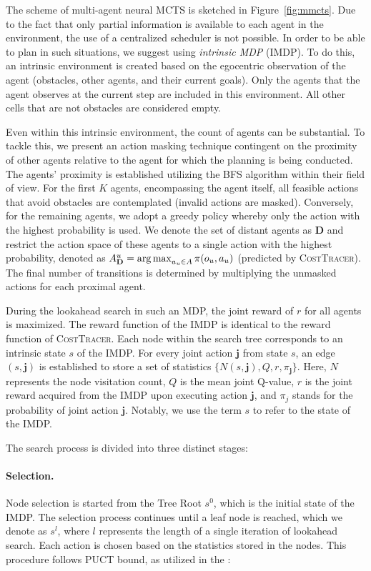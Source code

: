 \documentclass[letterpaper]{article} %
\newcommand{\argmax}{\operatornamewithlimits{arg\,max}}  %
\begin{document}
The scheme of multi-agent neural MCTS is sketched in Figure~\ref{fig:mmcts}.
Due to the fact that only partial information is available to each agent in the environment, the use of a centralized scheduler is not possible. In order to be able to plan in such situations, we suggest using \textit{intrinsic MDP} (IMDP). To do this, an intrinsic environment is created based on the egocentric observation of the agent (obstacles, other agents, and their current goals). Only the agents that the agent observes at the current step are included in this environment. All other cells that are not obstacles are considered empty. 


Even within this intrinsic environment, the count of agents can be substantial. To tackle this, we present an action masking technique contingent on the proximity of other agents relative to the agent for which the planning is being conducted. The agents' proximity is established utilizing the BFS algorithm within their field of view. For the first $K$ agents, encompassing the agent itself, all feasible actions that avoid obstacles are contemplated (invalid actions are masked). Conversely, for the remaining agents, we adopt a greedy policy whereby only the action with the highest probability is used.
We denote the set of distant agents as $\mathbf{D}$ and restrict the action space of these agents to a single action with the highest probability, denoted as $A_\mathbf{D}^u = \argmax_{a_u \in A} \pi(o_u, a_u)$ (predicted by \textsc{CostTracer}). The final number of transitions is determined by multiplying the unmasked actions for each proximal agent.


During the lookahead search in such an MDP, the joint reward of $r$ for all agents is maximized. The reward function of the IMDP is identical to the reward function of  \textsc{CostTracer}.
Each node within the search tree corresponds to an intrinsic state $s$ of the IMDP. For every joint action $\mathbf{j}$ from state $s$, an edge $(s, \mathbf{j})$ is established to store a set of statistics $\{N(s,\mathbf{j}), Q, r, \pi_\mathbf{j}\}$. Here, $N$ represents the node visitation count, $Q$ is the mean joint Q-value, $r$ is the joint reward acquired from the IMDP upon executing action $\mathbf{j}$, and $\pi_j$ stands for the probability of joint action $\mathbf{j}$. Notably, we use the term $s$ to refer to the state of the IMDP.

The search process is divided into three distinct stages:

\paragraph{Selection.} Node selection is started from the Tree Root $s^0$, which is the initial state of the IMDP. The selection process continues until a leaf node is reached, which we denote as $s^l$, where $l$ represents the length of a single iteration of lookahead search. Each action is chosen based on the statistics stored in the nodes. This procedure follows PUCT bound, as utilized in the \cite{schrittwieser2020mastering}: 
\end{document}

